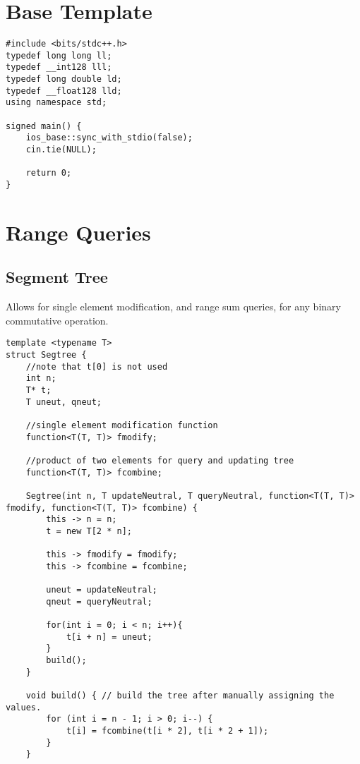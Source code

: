 \documentclass[8pt, headheight=10pt, a4paper]{article}
\title{\scalebox{2}{\fontsize{32pt}{0pt}\selectfont \textbf{Goon}}}
\author{\scalebox{1}{\fontsize{16pt}{0pt}\selectfont {Andwerp, dmot, Duckling}}}
\affil{\scalebox{1}{\fontsize{12pt}{0pt}\selectfont {Texas A\&M University}}}
\begin{document}
\begin{titlingpage}
\maketitle
\end{titlingpage}
\pagebreak

\begin{multicols*}{3}
\section{Base Template}
\begin{lstlisting}
#include <bits/stdc++.h>
typedef long long ll;
typedef __int128 lll;
typedef long double ld;
typedef __float128 lld;
using namespace std;

signed main() {
    ios_base::sync_with_stdio(false);
    cin.tie(NULL);
    
    return 0;
}
\end{lstlisting}

\section{Range Queries}
\subsection{Segment Tree}
Allows for single element modification, and range sum queries, for any binary commutative operation. 
\begin{lstlisting}
template <typename T>
struct Segtree {
    //note that t[0] is not used
    int n;
    T* t;
    T uneut, qneut;

    //single element modification function
    function<T(T, T)> fmodify;

    //product of two elements for query and updating tree
    function<T(T, T)> fcombine;

    Segtree(int n, T updateNeutral, T queryNeutral, function<T(T, T)> fmodify, function<T(T, T)> fcombine) {
        this -> n = n;
        t = new T[2 * n];

        this -> fmodify = fmodify;
        this -> fcombine = fcombine;

        uneut = updateNeutral;
        qneut = queryNeutral;

        for(int i = 0; i < n; i++){
            t[i + n] = uneut;
        }
        build();
    }

    void build() { // build the tree after manually assigning the values.
        for (int i = n - 1; i > 0; i--) {   
            t[i] = fcombine(t[i * 2], t[i * 2 + 1]);
        }
    }


\end{lstlisting}
\end{multicols*}
\end{document}
